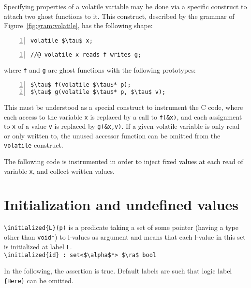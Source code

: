 Specifying properties of a volatile variable may be done via a
specific construct to attach two ghost functions to it. This
construct, described by the grammar of Figure~\ref{fig:gram:volatile}, has
the following shape:
\begin{lstlisting}[style=c-basic,firstnumber=1,name=volatile,numbers=left]
volatile $\tau$ x;
\end{lstlisting}
\begin{lstlisting}[style=c-basic,name=volatile,numbers=left]
//@ volatile x reads f writes g;
\end{lstlisting}
where \lstinline|f| and \lstinline|g| are ghost functions with the following prototypes:
\begin{lstlisting}[style=c-basic,name=volatile,numbers=left]
$\tau$ f(volatile $\tau$* p);
$\tau$ g(volatile $\tau$* p, $\tau$ v);
\end{lstlisting}
This must be understood as a special construct to instrument the C
code, where each access to the variable \lstinline|x| is replaced by a call
to \lstinline|f(&x)|, and each assignment to \lstinline|x| of a value
\lstinline|v|
is replaced by \lstinline|g(&x,v)|. If a given volatile variable is only read 
or only written to, the unused accessor function can be omitted from the 
\lstinline|volatile| construct.

\begin{example}
  The following code is instrumented in order to inject fixed values
  at each read of variable \lstinline|x|, and collect written values.
\end{example}


\section{Initialization and undefined values}
\label{sec:initialized}
\lstinline|\initialized{L}(p)| is a predicate taking a set of some pointer
(having a type other than \lstinline|void*|) to l-values as
argument and means that each l-value in this set is initialized at label \lstinline|L|.
\\ \makebox[5mm]{} \lstinline|\initialized{id} : set<$\alpha$*> $\ra$ bool|

\begin{example}
  In the following, the assertion is true.
  Default labels are 
  such that logic label \lstinline|{Here}| can be omitted.
\end{example}

